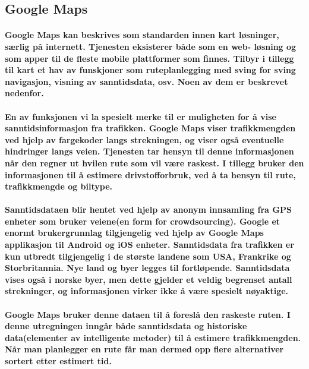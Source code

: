 \subsection{Google Maps}

\paragraph{Google Maps kan beskrives som standarden innen kart løsninger, særlig på internett. Tjenesten eksisterer både som en web- løsning og som apper til de fleste mobile plattformer som finnes. Tilbyr i tillegg til kart et hav av funskjoner som ruteplanlegging med sving for sving navigasjon, visning av sanntidsdata, osv. Noen av dem er beskrevet nedenfor.}

\paragraph{En av funksjonen vi la spesielt merke til er muligheten for å vise sanntidsinformasjon fra trafikken. Google Maps viser trafikkmengden ved hjelp av fargekoder langs strekningen, og viser også eventuelle hindringer langs veien. Tjenesten tar hensyn til denne informasjonen når den regner ut hvilen rute som vil være raskest. I tillegg bruker den informasjonen til å estimere drivstofforbruk, ved å ta hensyn til rute, trafikkmengde og biltype.}

\paragraph{Sanntidsdataen blir hentet ved hjelp av anonym innsamling fra GPS enheter som bruker veiene(en form for crowdsourcing). Google et enormt brukergrunnlag tilgjengelig ved hjelp av Google Maps applikasjon til Android og iOS enheter. Sanntidsdata fra trafikken er kun utbredt tilgjengelig i de største landene som USA, Frankrike og Storbritannia. Nye land og byer legges til fortløpende. Sanntidsdata vises også i norske byer, men dette gjelder et veldig begrenset antall strekninger, og informasjonen virker ikke å være spesielt nøyaktige.}

\paragraph{Google Maps bruker denne dataen til å foreslå den raskeste ruten. I denne utregningen inngår både sanntidsdata og historiske data(elementer av intelligente metoder) til å estimere trafikkmengden. Når man planlegger en rute får man dermed opp flere alternativer sortert etter estimert tid.}

